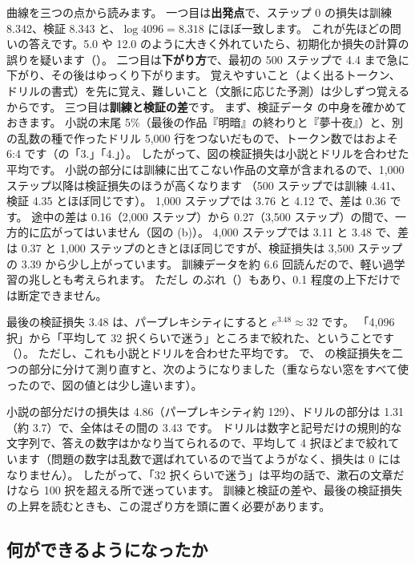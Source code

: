 曲線を三つの点から読みます。
一つ目は\textbf{出発点}で、ステップ 0 の損失は訓練 8.342、検証 8.343 と、$\log 4096 = 8.318$ にほぼ一致します。
これが先ほどの問いの答えです。5.0 や 12.0 のように大きく外れていたら、初期化か損失の計算の誤りを疑います（）。
二つ目は\textbf{下がり方}で、最初の 500 ステップで 4.4 まで急に下がり、その後はゆっくり下がります。
覚えやすいこと（よく出るトークン、ドリルの書式）を先に覚え、難しいこと（文脈に応じた予測）は少しずつ覚えるからです。
三つ目は\textbf{訓練と検証の差}です。
まず、検証データ  の中身を確かめておきます。
小説の末尾 5\%（最後の作品『明暗』の終わりと『夢十夜』）と、別の乱数の種で作ったドリル 5,000 行をつないだもので、トークン数ではおよそ 6:4 です（の「3.」「4.」）。
したがって、図の検証損失は小説とドリルを合わせた平均です。
小説の部分には訓練に出てこない作品の文章が含まれるので、1,000 ステップ以降は検証損失のほうが高くなります
（500 ステップでは訓練 4.41、検証 4.35 とほぼ同じです）。
1,000 ステップでは 3.76 と 4.12 で、差は 0.36 です。
途中の差は 0.16（2,000 ステップ）から 0.27（3,500 ステップ）の間で、一方的に広がってはいません（図の (b)）。
4,000 ステップでは 3.11 と 3.48 で、差は 0.37 と 1,000 ステップのときとほぼ同じですが、検証損失は 3,500 ステップの 3.39 から少し上がっています。
訓練データを約 6.6 回読んだので、軽い過学習の兆しとも考えられます。
ただし  のぶれ（）もあり、0.1 程度の上下だけでは断定できません。

最後の検証損失 3.48 は、パープレキシティにすると $e^{3.48}\approx 32$ です。
「4,096 択」から「平均して 32 択くらいで迷う」ところまで絞れた、ということです（）。
ただし、これも小説とドリルを合わせた平均です。
 で、 の検証損失を二つの部分に分けて測り直すと、次のようになりました（重ならない窓をすべて使ったので、図の値とは少し違います）。


小説の部分だけの損失は 4.86（パープレキシティ約 129）、ドリルの部分は 1.31（約 3.7）で、全体はその間の 3.43 です。
ドリルは数字と記号だけの規則的な文字列で、答えの数字はかなり当てられるので、平均して 4 択ほどまで絞れています（問題の数字は乱数で選ばれているので当てようがなく、損失は 0 にはなりません）。
したがって、「32 択くらいで迷う」は平均の話で、漱石の文章だけなら 100 択を超える所で迷っています。
訓練と検証の差や、最後の検証損失の上昇を読むときも、この混ざり方を頭に置く必要があります。

\subsection{何ができるようになったか}

